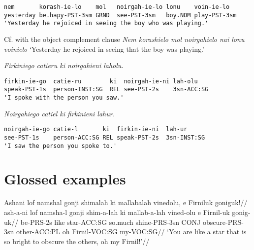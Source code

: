 \documentclass[a4paper,]{article}
\begin{document}
\begin{verbatim}
nem       korash-ie-lo    mol   noirgah-ie-lo lonu    voin-ie-lo
yesterday be.hapy-PST-3sm GRND  see-PST-3sm   boy.NOM play-PST-3sm
'Yesterday he rejoiced in seeing the boy who was playing.'
\end{verbatim}

Cf. with the object complement clause \emph{Nem korashielo mol
noirgahielo nai lonu voinielo} `Yesterday he rejoiced in seeing that the
boy was playing.'

\emph{Firkiniego catieru ki noirgahieni laholu.}

\begin{verbatim}
firkin-ie-go  catie-ru        ki  noirgah-ie-ni lah-olu
speak-PST-1s  person-INST:SG  REL see-PST-2s    3sn-ACC:SG
'I spoke with the person you saw.'
\end{verbatim}

\emph{Noirgahiego catiel ki firkinieni lahur.}

\begin{verbatim}
noirgah-ie-go catie-l       ki  firkin-ie-ni  lah-ur
see-PST-1s    person-ACC:SG REL speak-PST-2s  3sn-INST:SG
'I saw the person you spoke to.'
\end{verbatim}

\hypertarget{glossed-examples}{%
\section{Glossed examples}\label{glossed-examples}}

\ex \begingl \glpreamble Ashani lof namshal gonji shimalah ki mallabalah
vinedolu, e Firniluk goniguk!// \gla ash-a-ni lof namsha-l gonji
shim-a-lah ki mallab-a-lah vined-olu e Firnil-uk gonig-uk//
\glb be-PRS-2s like star-ACC:SG so.much shine-PRS-3sn CONJ
obscure-PRS-3sn other-ACC:PL oh Firnil-VOC:SG my-VOC:SG// \glft `You are
like a star that is so bright to obscure the others, oh my Firnil!'//
\endgl \xe
\end{document}
